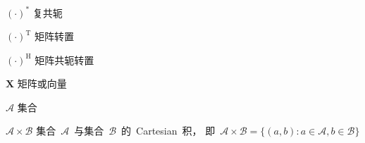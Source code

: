 % 

\begin{listofnotations}
\item [$(\cdot)^*$] 复共轭
\item [$(\cdot)^{\mathrm T}$] 矩阵转置
\item [$(\cdot)^{\mathrm H}$] 矩阵共轭转置
\item [$\boldsymbol{X}$] 矩阵或向量
\item [$\mathcal{A}$] 集合
\item [$\mathcal{A}\times\mathcal{B}$] 
  集合~$\mathcal{A}$~与集合~$\mathcal{B}$~的~Cartesian~积，
  即~$\mathcal{A}\times\mathcal{B}=\{(a,b):a\in\mathcal{A},b\in\mathcal{B}\}$
\end{listofnotations}

